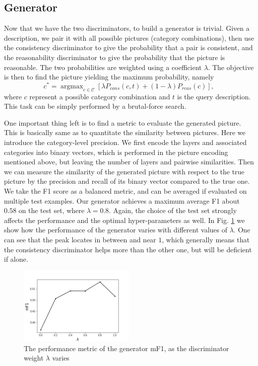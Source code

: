 \documentclass{article} %
\begin{document}
\subsection{Generator}
Now that we have the two discriminators, to build a generator is trivial. Given a description, we pair it with all possible pictures (category combinations), then use the consistency discriminator to give the probability that a pair is consistent, and the reasonability discriminator to give the probability that the picture is reasonable. The two probabilities are weighted using a coefficient $\lambda$. The objective is then to find the picture yielding the maximum probability, namely
$$
c^* = \mathop{\arg\max}_{c\in\mathcal{C}} \left[ \lambda P_{cons}(c,t)  + (1-\lambda) P_{reas}(c) \right],
$$
where $c$ represent a possible category combination and $t$ is the query description. This task can be simply performed by a brutal-force search. 

One important thing left is to find a metric to evaluate the generated picture. This is basically same as to quantitate the similarity between pictures. Here we introduce the category-level precision. We first encode the layers and associated categories into binary vectors, which is performed in the picture encoding mentioned above, but leaving the number of layers and pairwise similarities. Then we can measure the similarity of the generated picture with respect to the true picture by the precision and recall of its binary vector compared to the true one. We take the F1 score as a balanced metric, and can be averaged if evaluated on multiple test examples. Our generator achieves a maximum average F1 about $0.58$ on the test set, where $\lambda=0.8$. Again, the choice of the test set strongly affects the performance and the optimal hyper-parameters as well. In Fig. \ref{fig: lamb} we show how the performance of the generator varies with different values of $\lambda$. One can see that the peak locates in between and near $1$, which generally means that the consistency discriminator helps more than the other one, but will be deficient if alone.

\begin{figure}
	\centering
	\includegraphics[width=0.5\textwidth]{../results/generator_lamb-metric}
	\caption{The performance metric of the generator mF1, as the discriminator weight $\lambda$ varies}
	\label{fig: lamb}
\end{figure}
\end{document}
